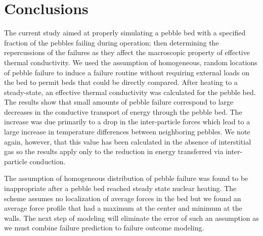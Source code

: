 
\section{Conclusions}
\label{concs}
The current study aimed at properly simulating a pebble bed with a specified fraction of the pebbles failing during operation; then determining the repercussions of the failures as they affect the macroscopic property of effective thermal conductivity. We used the assumption of homogeneous, random locations of pebble failure to induce a failure routine without requiring external loads on the bed to permit beds that could be directly compared. After heating to a steady-state, an effective thermal conductivity was calculated for the pebble bed. The results show that small amounts of pebble failure correspond to large decreases in the conductive transport of energy through the pebble bed. The increase was due primarily to a drop in the inter-particle forces which lead to a large increase in temperature differences between neighboring pebbles. We note again, however, that this value has been calculated in the absence of interstitial gas so the results apply only to the reduction in energy transferred via inter-particle conduction.


The assumption of homogeneous distribution of pebble failure was found to be inappropriate after a pebble bed reached steady state nuclear heating. The scheme assumes no localization of average forces in the bed but we found an average force profile that had a maximum at the center and minimum at the walls. The next step of modeling will eliminate the error of such an assumption as we must combine failure prediction to failure outcome modeling. 


